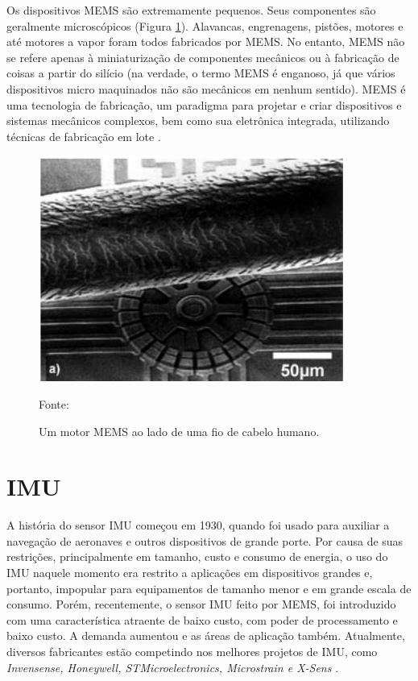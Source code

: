 		Os dispositivos MEMS são extremamente pequenos. Seus componentes são geralmente microscópicos (Figura \ref{escala_mems}). Alavancas, engrenagens, pistões, motores e até motores a vapor foram todos fabricados por MEMS. No entanto, MEMS não se refere apenas à miniaturização de componentes mecânicos ou à fabricação de coisas a partir do silício (na verdade, o termo MEMS é enganoso, já que vários dispositivos micro maquinados não são mecânicos em nenhum sentido). MEMS é uma tecnologia de fabricação, um paradigma para projetar e criar dispositivos e sistemas mecânicos complexos, bem como sua eletrônica integrada, utilizando técnicas de fabricação em lote \cite{prime2002}.

		\begin{figure}[h]
			\centering
			\includegraphics[keepaspectratio=true,scale=0.5
			]{figuras/escala_mems.png}
			\caption{Um motor MEMS ao lado de uma fio de cabelo humano.}
			Fonte: \cite{prime2002}
			\label{escala_mems}
		\end{figure}

	\section{IMU}

		A história do sensor IMU começou em 1930, quando foi usado para auxiliar a navegação de aeronaves e outros dispositivos de grande porte. Por causa de suas restrições, principalmente em tamanho, custo e consumo de energia, o uso do IMU naquele momento era restrito a aplicações em dispositivos grandes e, portanto, impopular para equipamentos de tamanho menor e em grande escala de consumo. Porém, recentemente, o sensor IMU feito por MEMS, foi introduzido com uma característica atraente de baixo custo, com poder de processamento e baixo custo. A demanda aumentou e as áreas de aplicação também. Atualmente, diversos fabricantes estão competindo nos melhores projetos de IMU, como \textit{Invensense, Honeywell, STMicroelectronics, Microstrain e X-Sens} \cite{ahmad2013}.
		
